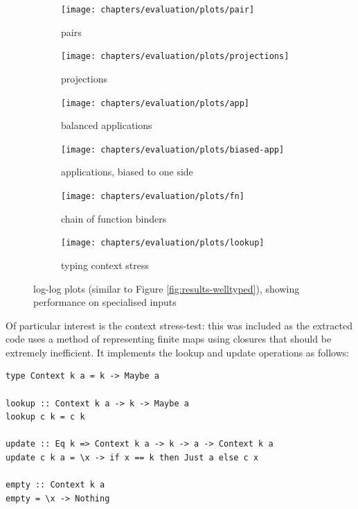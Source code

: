 \begin{figure}
\centering
\begin{subfigure}{.49\textwidth}
 \centering
 \texttt{[image: chapters/evaluation/plots/pair]}
 \caption{pairs}
\end{subfigure}
\begin{subfigure}{.49\textwidth}
 \centering
 \texttt{[image: chapters/evaluation/plots/projections]}
 \caption{projections}
\end{subfigure}
\begin{subfigure}{.49\textwidth}
 \centering
 \texttt{[image: chapters/evaluation/plots/app]}
 \caption{balanced applications}
\end{subfigure}
\begin{subfigure}{.49\textwidth}
 \centering
 \texttt{[image: chapters/evaluation/plots/biased-app]}
 \caption{applications, biased to one side}
\end{subfigure}
\begin{subfigure}{.49\textwidth}
 \centering
 \texttt{[image: chapters/evaluation/plots/fn]}
 \caption{chain of function binders}
\end{subfigure}
\begin{subfigure}{.49\textwidth}
 \centering
 \texttt{[image: chapters/evaluation/plots/lookup]}
 \caption{typing context stress}
\end{subfigure}
\caption{log-log plots (similar to Figure \ref{fig:results-welltyped}), showing performance on specialised inputs}
\label{fig:results-combined}
\end{figure}

Of particular interest is the context stress-test: this was included as the extracted code uses a method of representing finite maps using closures that should be extremely inefficient.
It implements the lookup and update operations as follows:

\begin{verbatim}
type Context k a = k -> Maybe a

lookup :: Context k a -> k -> Maybe a
lookup c k = c k

update :: Eq k => Context k a -> k -> a -> Context k a
update c k a = \x -> if x == k then Just a else c x

empty :: Context k a
empty = \x -> Nothing
\end{verbatim}

